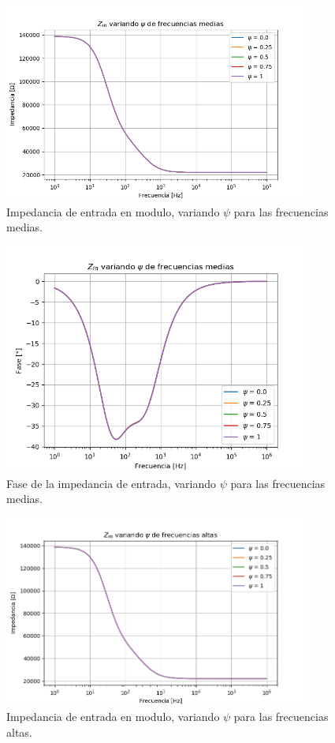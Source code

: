 \documentclass[a4paper]{article}
\begin{document}
\begin{figure}[H]
\centering
	\includegraphics[width=0.9\textwidth, trim = {0 0 0 1.35cm}, clip]{Imagenes/Zin-Med-Mod.png}
	\caption{Impedancia de entrada en modulo, variando $\psi$ para las frecuencias medias.}
	\label{fig:zin_modulo_med}
\end{figure}
\begin{figure}[H]
\centering
	\includegraphics[width=0.9\textwidth, trim = {0 0 0 1.35cm}, clip]{Imagenes/Zin-Med-Ph.png}
	\caption{Fase de la impedancia de entrada, variando $\psi$ para las frecuencias medias.}
	\label{fig:zin_ph_med}
\end{figure}
\begin{figure}[H]
\centering
	\includegraphics[width=0.9\textwidth, trim = {0 0 0 1.35cm}, clip]{Imagenes/Zin-High-Mod.png}
	\caption{Impedancia de entrada en modulo, variando $\psi$ para las frecuencias altas.}
	\label{fig:zin_modulo_high}
\end{figure}
\end{document}
